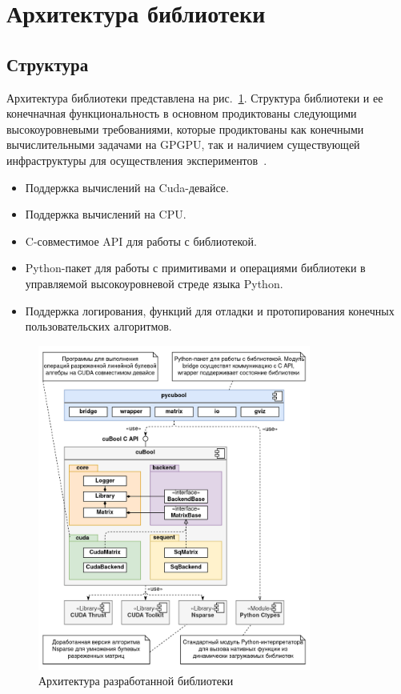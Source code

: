 \section{Архитектура библиотеки}

\subsection{Структура}

Архитектура библиотеки представлена на рис.~\ref{fig:cubool_architecture}.
Структура библиотеки и ее конечначная функциональность в основном продиктованы следующими высокоуровневыми требованиями, которые продиктованы как конечными вычислительными задачами на GPGPU, так и наличием существующей инфраструктуры для осуществления экспериментов~\cite{net:cfpq_py_algo}.

\begin{itemize}
    \item Поддержка вычислений на Cuda-девайсе.
    \item Поддержка вычислений на CPU.
    \item C-совместимое API для работы с библиотекой.
    \item Python-пакет для работы с примитивами и операциями библиотеки в управляемой высокоуровневой стреде языка Python.
    \item Поддержка логирования, функций для отладки и протопирования конечных пользовательских алгоритмов.
\end{itemize}

\begin{figure}[h]
    \centering
    \includegraphics[width=0.8\textwidth]{images/library_architecture.png}
    \caption{Архитектура разработанной библиотеки}
    \label{fig:cubool_architecture}
\end{figure}

